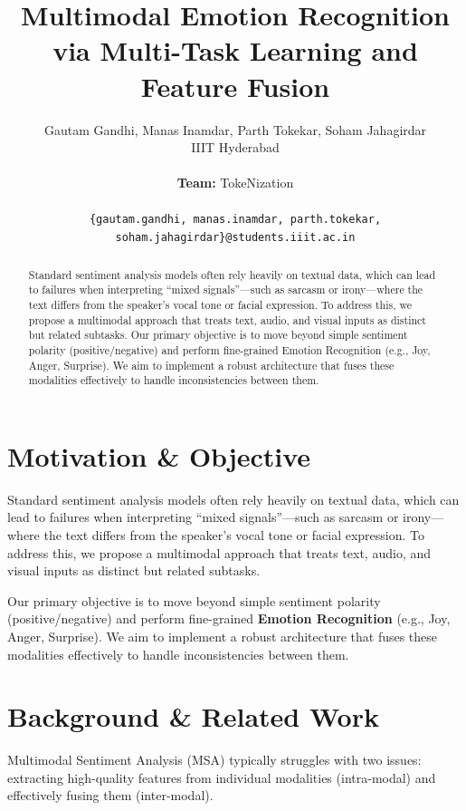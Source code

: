 \documentclass[11pt]{article}
\title{Multimodal Emotion Recognition via Multi-Task Learning and Feature Fusion}
\author{Gautam Gandhi, Manas Inamdar, Parth Tokekar, Soham Jahagirdar \\
  IIIT Hyderabad \\
  \\
  \textbf{Team:} TokeNization \\
  \\
  \small{\texttt{\{gautam.gandhi, manas.inamdar, parth.tokekar, soham.jahagirdar\}@students.iiit.ac.in}}}
\begin{document}
\maketitle

\begin{abstract}
Standard sentiment analysis models often rely heavily on textual data, which can lead to failures when interpreting ``mixed signals''---such as sarcasm or irony---where the text differs from the speaker's vocal tone or facial expression. To address this, we propose a multimodal approach that treats text, audio, and visual inputs as distinct but related subtasks. Our primary objective is to move beyond simple sentiment polarity (positive/negative) and perform fine-grained Emotion Recognition (e.g., Joy, Anger, Surprise). We aim to implement a robust architecture that fuses these modalities effectively to handle inconsistencies between them.
\end{abstract}

\section{Motivation \& Objective}

Standard sentiment analysis models often rely heavily on textual data, which can lead to failures when interpreting ``mixed signals''---such as sarcasm or irony---where the text differs from the speaker's vocal tone or facial expression. To address this, we propose a multimodal approach that treats text, audio, and visual inputs as distinct but related subtasks.

Our primary objective is to move beyond simple sentiment polarity (positive/negative) and perform fine-grained \textbf{Emotion Recognition} (e.g., Joy, Anger, Surprise). We aim to implement a robust architecture that fuses these modalities effectively to handle inconsistencies between them.

\section{Background \& Related Work}

Multimodal Sentiment Analysis (MSA) typically struggles with two issues: extracting high-quality features from individual modalities (intra-modal) and effectively fusing them (inter-modal).
\end{document}
